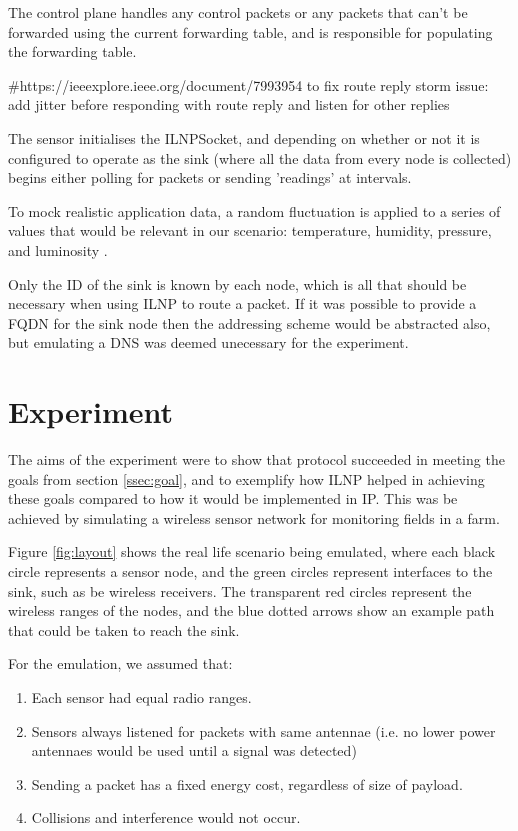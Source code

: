 \documentclass[12pt]{article}
\begin{document}
The control plane handles any control packets or any packets that can't be forwarded using the current forwarding table, and is responsible for populating the forwarding table.

\#https://ieeexplore.ieee.org/document/7993954 to fix route reply storm issue: add jitter before responding with route reply and listen for other replies

The sensor initialises the ILNPSocket, and depending on whether or not it is configured to operate as the sink (where all the data from every node is collected) begins either polling for packets or sending 'readings' at intervals.

To mock realistic application data, a random fluctuation is applied to a series of values that would be relevant in our scenario: temperature, humidity, pressure, and luminosity \cite{agrisensor}.

Only the ID of the sink is known by each node, which is all that should be necessary when using ILNP to route a packet. If it was possible to provide a FQDN for the sink node then the addressing scheme would be abstracted also, but emulating a DNS was deemed unecessary for the experiment.

\pagebreak
\section{Experiment}

The aims of the experiment were to show that protocol succeeded in meeting the goals from section \ref{ssec:goal}, and to exemplify how ILNP helped in achieving these goals compared to how it would be implemented in IP. This was be achieved by simulating a wireless sensor network for monitoring fields in a farm. 

Figure \ref{fig:layout} shows the real life scenario being emulated, where each black circle represents a sensor node, and the green circles represent interfaces to the sink, such as be wireless receivers. The transparent red circles represent the wireless ranges of the nodes, and the blue dotted arrows show  an example path that could be taken to reach the sink.

For the emulation, we assumed that: 
\begin{enumerate}
    \item Each sensor had equal radio ranges.
    \item Sensors always listened for packets with same antennae (i.e. no lower power antennaes would be used until a signal was detected\cite{offon})
    \item Sending a packet has a fixed energy cost, regardless of size of payload.
    \item Collisions and interference would not occur.
\end{enumerate}
\end{document}
